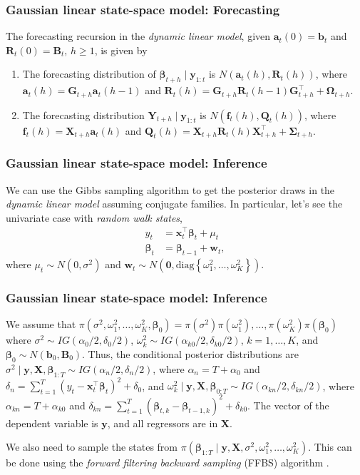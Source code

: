 \documentclass[12pt, compress]{beamer}
\begin{document}
\begin{frame}
	\frametitle{Gaussian linear state-space model: Forecasting}
The forecasting recursion in the \textit{dynamic linear model}, given $\bm{a}_t(0)=\bm{b}_t$ and $\bm{R}_t(0)=\bm{B}_t$, $h\geq 1$, is given by 
\begin{enumerate}
	\item The forecasting distribution of $\bm{\beta}_{t+h}\mid \bm{y}_{1:t}$ is $N(\bm{a}_t(h),\bm{R}_t(h))$, where $\bm{a}_t(h)=\bm{G}_{t+h}\bm{a}_{t}(h-1)$ and $\bm{R}_t(h)=\bm{G}_{t+h}\bm{R}_t(h-1)\bm{G}_{t+h}^{\top}+\bm{\Omega}_{t+h}$.
	\item The forecasting distribution $\bm{Y}_{t+h}\mid \bm{y}_{1:t}$ is $N(\bm{f}_t(h),\bm{Q}_t(h))$, where $\bm{f}_t(h)=\bm{X}_{t+h}\bm{a}_t(h)$ and $\bm{Q}_t(h)=\bm{X}_{t+h}\bm{R}_t(h)\bm{X}_{t+h}^{\top}+\bm{\Sigma}_{t+h}$.  
\end{enumerate}

\end{frame}

\begin{frame}
	\frametitle{Gaussian linear state-space model: Inference}
We can use the Gibbs sampling algorithm to get the posterior draws in the \textit{dynamic linear model} assuming conjugate families. In particular, let's see the univariate case with \textit{random walk states}, 
\begin{align}
	y_t&=\bm{x}_t^{\top}\bm{\beta}_t+\mu_t\label{eq1Obs}\\
	\bm{\beta}_t&=\bm{\beta}_{t-1}+\bm{w}_t \label{eq1St},
\end{align}
where $\mu_t\sim N(0,\sigma^2)$ and $\bm{w}_t\sim N(\bm{0},\text{diag}\left\{\omega_1^2,\dots,\omega_K^2\right\})$. 
\end{frame}

\begin{frame}
	\frametitle{Gaussian linear state-space model: Inference}
We assume that $\pi(\sigma^2,\omega_1^2,\dots,\omega_K^2,\bm{\beta}_0)=\pi(\sigma^2)\pi(\omega_1^2),\dots,\pi(\omega_K^2)\pi(\bm{\beta}_0)$ where $\sigma^2\sim IG(\alpha_0/2,\delta_0/2)$, $\omega_k^2\sim IG(\alpha_{k0}/2,\delta_{k0}/2)$, $k=1,\dots,K$, and $\bm{\beta}_0\sim N(\bm{b}_0,\bm{B}_0)$. Thus, the conditional posterior distributions are $\sigma^2\mid \bm{y},\bm{X},\bm{\beta}_{1:T}\sim IG(\alpha_{n}/2,\delta_n/2)$, where $\alpha_{n}=T+\alpha_0$ and $\delta_n=\sum_{t=1}^T(y_t-\bm{x}_t^{\top}\bm{\beta}_t)^2+\delta_0$, and $\omega_k^2\mid \bm{y},\bm{X},\bm{\beta}_{0:T}\sim IG(\alpha_{kn}/2,\delta_{kn}/2)$, where $\alpha_{kn}=T+\alpha_{k0}$ and $\delta_{kn}=\sum_{t=1}^T(\bm{\beta}_{t,k}-\bm{\beta}_{t-1,k})^2+\delta_{k0}$. The vector of the dependent variable is $\bm{y}$, and all regressors are in $\bm{X}$.

We also need to sample the states from $\pi(\bm{\beta}_{1:T}\mid \bm{y},\bm{X},\sigma^2,\omega_1^2,\dots,\omega_K^2)$. This can be done using the \textit{forward filtering backward sampling} (FFBS) algorithm \citep{carter1994gibbs,fruhwirth1994data,shephard1994partial}.

\end{frame}
\end{document}
